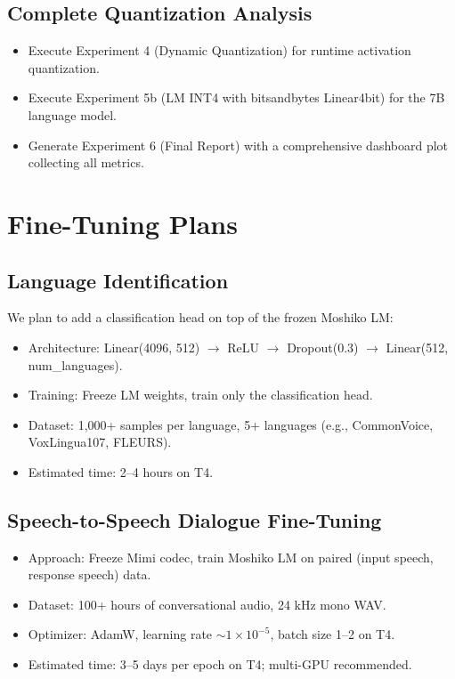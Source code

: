 \documentclass[12pt,a4paper]{report}
\begin{document}
\subsection{Complete Quantization Analysis}
\begin{itemize}
    \item Execute Experiment 4 (Dynamic Quantization) for runtime activation quantization.
    \item Execute Experiment 5b (LM INT4 with bitsandbytes Linear4bit) for the 7B language model.
    \item Generate Experiment 6 (Final Report) with a comprehensive dashboard plot collecting all metrics.
\end{itemize}

\section{Fine-Tuning Plans}

\subsection{Language Identification}
We plan to add a classification head on top of the frozen Moshiko LM:
\begin{itemize}
    \item Architecture: Linear(4096, 512) $\rightarrow$ ReLU $\rightarrow$ Dropout(0.3) $\rightarrow$ Linear(512, num\_languages).
    \item Training: Freeze LM weights, train only the classification head.
    \item Dataset: 1,000+ samples per language, 5+ languages (e.g., CommonVoice, VoxLingua107, FLEURS).
    \item Estimated time: 2--4 hours on T4.
\end{itemize}

\subsection{Speech-to-Speech Dialogue Fine-Tuning}
\begin{itemize}
    \item Approach: Freeze Mimi codec, train Moshiko LM on paired (input speech, response speech) data.
    \item Dataset: 100+ hours of conversational audio, 24 kHz mono WAV.
    \item Optimizer: AdamW, learning rate $\sim 1 \times 10^{-5}$, batch size 1--2 on T4.
    \item Estimated time: 3--5 days per epoch on T4; multi-GPU recommended.
\end{itemize}
\end{document}
